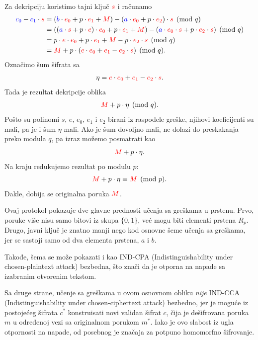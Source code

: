 Za dekripciju koristimo tajni ključ ${\color{red}s}$ i računamo
\[
    \begin{aligned}
        {\color{blue}c_0} - {\color{blue}c_1} \cdot {\color{red}s}
        &=
        ({\color{blue}b} \cdot {\color{red}e_0} + p \cdot {\color{red}e_1} + {\color{red}M})
        -
        ({\color{blue}a} \cdot {\color{red}e_0} + p \cdot {\color{red}e_2})\cdot {\color{red}s} \pmod q \\
        &=
        (({\color{blue}a} \cdot {\color{red}s} + p \cdot {\color{red}e})\cdot {\color{red}e_0} + p \cdot {\color{red}e_1} + {\color{red}M})
        -
        ({\color{blue}a} \cdot {\color{red}e_0} \cdot {\color{red}s} + p \cdot {\color{red}e_2} \cdot {\color{red}s}) \pmod q \\
        &=
        p \cdot {\color{red}e} \cdot {\color{red}e_0} + p \cdot {\color{red}e_1} + {\color{red}M}
        -
        p \cdot {\color{red}e_2} \cdot {\color{red}s} \pmod q \\
        &=
        {\color{red}M} + p \cdot ({\color{red}e} \cdot {\color{red}e_0} + {\color{red}e_1} - {\color{red}e_2} \cdot {\color{red}s}) \pmod q.
    \end{aligned}
\]
Označimo šum šifrata sa
\[
    \eta = {\color{red}e} \cdot {\color{red}e_0} + {\color{red}e_1} - {\color{red}e_2} \cdot {\color{red}s}.
\]
Tada je rezultat dekripcije oblika
\[
    {\color{red}M} + p \cdot \eta \pmod q.
\]
Pošto su polinomi $s$, $e$, $e_0$, $e_1$ i $e_2$ birani iz raspodele greške,
njihovi koeficijenti su mali, pa je i šum $\eta$ mali. Ako je šum dovoljno mali,
ne dolazi do preskakanja preko modula $q$, pa izraz možemo posmatrati kao
\[
    {\color{red}M} + p \cdot \eta.
\]
Na kraju redukujemo rezultat po modulu $p$:
\[
    {\color{red}M} + p \cdot \eta \equiv {\color{red}M} \pmod p.
\]
Dakle, dobija se originalna poruka ${\color{red}M}$.

Ovaj protokol pokazuje dve glavne prednosti učenja sa greškama u prstenu.
Prvo, poruke više nisu samo bitovi iz skupa $\{0,1\}$, već mogu biti elementi prstena $R_p$.
Drugo, javni ključ je znatno manji nego kod osnovne šeme učenja sa greškama,
jer se sastoji samo od dva elementa prstena, $a$ i $b$.

Takođe, šema se može pokazati i kao IND-CPA (Indistinguishability under chosen-plaintext attack) bezbedna, 
što znači da je otporna na napade sa izabranim otvorenim tekstom.

Sa druge strane, učenje sa greškama u ovom osnovnom obliku \emph{nije} 
IND-CCA (Indistinguishability under chosen-ciphertext attack) bezbedno, 
jer je moguće iz postojećeg šifrata $c^*$ konstruisati novi validan šifrat $c$, 
čija je dešifrovana poruka $m$ u određenoj vezi sa originalnom porukom $m^*$.
Iako je ovo slabost iz ugla otpornosti na napade, 
od posebnog je značaja za potpuno homomorfno šifrovanje.


